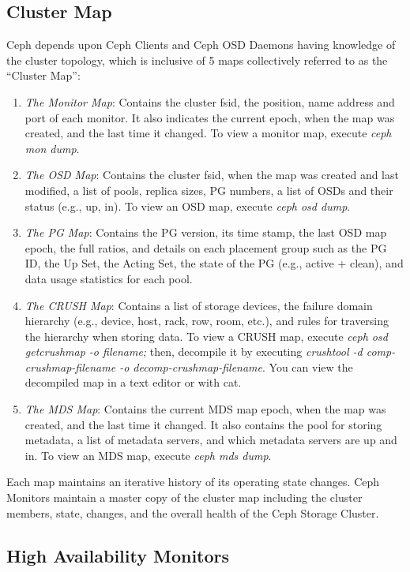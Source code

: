 \documentclass[12pt,a4paper]{report}
\begin{document}
\subsection{Cluster Map}

Ceph depends upon Ceph Clients and Ceph OSD Daemons having knowledge of the
cluster topology, which is inclusive of 5 maps collectively referred to as the
``Cluster Map'':
\begin{enumerate}
	\item \emph{The Monitor Map}: Contains the cluster fsid, the position,
		name address and port of each monitor. It also indicates the
		current epoch, when the map was created, and the last time it
		changed. To view a monitor map, execute \emph{ceph mon dump}.
	\item \emph{The OSD Map}: Contains the cluster fsid, when the map was
		created and last modified, a list of pools, replica sizes, PG
		numbers, a list of OSDs and their status (e.g., up, in). To
		view an OSD map, execute \emph{ceph osd dump}.
	\item \emph{The PG Map}: Contains the PG version, its time stamp, the
		last OSD map epoch, the full ratios, and details on each
		placement group such as the PG ID, the Up Set, the Acting Set,
		the state of the PG (e.g., active + clean), and data usage
		statistics for each pool.
	\item \emph{The CRUSH Map}: Contains a list of storage devices, the
		failure domain hierarchy (e.g., device, host, rack, row, room,
		etc.), and rules for traversing the hierarchy when storing
		data. To view a CRUSH map, execute \emph{ceph osd getcrushmap -o
		filename;} then, decompile it by executing \emph{crushtool -d
		comp-crushmap-filename -o decomp-crushmap-filename}. You can
		view the decompiled map in a text editor or with cat.
	\item \emph{The MDS Map}: Contains the current MDS map epoch, when the
		map was created, and the last time it changed. It also contains
		the pool for storing metadata, a list of metadata servers, and
		which metadata servers are up and in. To view an MDS map,
		execute \emph{ceph mds dump}.
\end{enumerate}

Each map maintains an iterative history of its operating state changes. Ceph
Monitors maintain a master copy of the cluster map including the cluster
members, state, changes, and the overall health of the Ceph Storage Cluster.

\subsection{High Availability Monitors}
\end{document}
